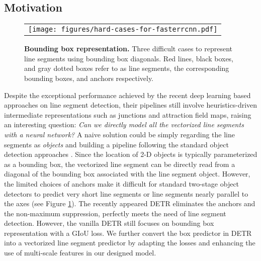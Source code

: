 \documentclass[final]{cvpr}
\begin{document}
\subsection{Motivation}
\vspace{-2mm}
\label{motivation}
\begin{figure}[!htp]
\vspace{-1mm}
\begin{center}
\begin{tabular} {c}
\hspace{-1mm}\texttt{[image: figures/hard-cases-for-fasterrcnn.pdf]}
\end{tabular}
\end{center}
\vspace{-1mm}
\caption{\footnotesize \textbf{Bounding box representation.} Three difficult cases to represent line segments using bounding box diagonals. Red lines, black boxes, and gray dotted boxes refer to as line segments, the corresponding bounding boxes, and anchors respectively.}
\label{fig:hard-cases-for-fasterrcnn}
\vspace{-4mm}
\end{figure}

Despite the exceptional performance achieved by the recent deep learning based approaches \cite{zhou2019end,xue2019learning,xue2020holistically} on line segment detection, their pipelines still involve heuristics-driven intermediate representations such as junctions and attraction field maps, raising an interesting question: \textit{Can we directly model all the vectorized line segments with a neural network?} A naive solution could be simply regarding the line segments as \textit{objects} and building a pipeline following the standard object detection approaches \cite{fasterrcnn}. Since the location of 2-D objects is typically parameterized as a bounding box, the vectorized line segment can be directly read from a diagonal of the bounding box associated with the line segment object. However, the limited choices of anchors make it difficult for standard two-stage object detectors to predict very short line segments or line segments nearly parallel to the axes (see Figure \ref{fig:hard-cases-for-fasterrcnn}). The recently appeared DETR \cite{carion2020end} eliminates the anchors and the non-maximum suppression, perfectly meets the need of line segment detection. However, the vanilla DETR still focuses on bounding box representation with a GIoU loss. We further convert the box predictor in DETR into a vectorized line segment predictor by adapting the losses and enhancing the use of multi-scale features in our designed model.
\end{document}
